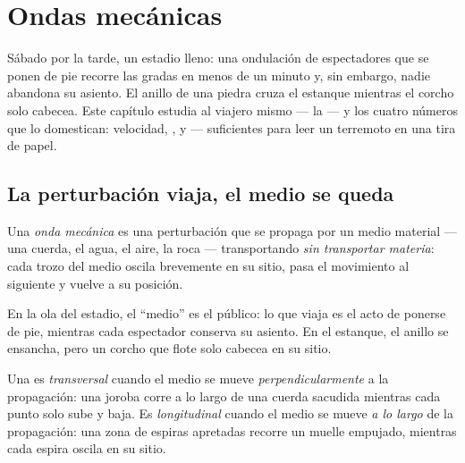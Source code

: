 \chapter{Ondas mecánicas}\label{ch:g12:mechanical-waves}

Sábado por la tarde, un estadio lleno: una ondulación de espectadores
que se ponen de pie recorre las gradas en menos de un minuto y, sin
embargo, nadie abandona su asiento. El anillo de una piedra cruza el
estanque mientras el corcho solo cabecea. Este capítulo estudia al
viajero mismo --- la  --- y los cuatro números que lo domestican:
velocidad, ,  y  --- suficientes para leer
un terremoto en una tira de papel.

\section{La perturbación viaja, el medio se queda}

\begin{definition}\label{def:g12:mechanical-waves:wave}
Una \emph{onda mecánica} es una perturbación que se
propaga por un medio material --- una cuerda, el agua, el aire, la roca
--- transportando  \emph{sin transportar materia}: cada trozo del
medio oscila brevemente en su sitio, pasa el movimiento al siguiente y
vuelve a su posición.
\end{definition}

\begin{example}\label{ex:g12:mechanical-waves:transport}
En la ola del estadio, el ``medio'' es el público: lo que viaja es el
acto de ponerse de pie, mientras cada espectador conserva su asiento. En
el estanque, el anillo se ensancha, pero un corcho que flote solo
cabecea en su sitio.
\end{example}

\begin{definition}\label{def:g12:mechanical-waves:transverse}
Una  es \emph{transversal} cuando el medio
se mueve \emph{perpendicularmente} a la propagación: una joroba corre a
lo largo de una cuerda sacudida mientras cada punto solo sube y baja. Es
\emph{longitudinal} cuando el medio se mueve
\emph{a lo largo} de la propagación: una zona de espiras apretadas
recorre un muelle empujado, mientras cada espira oscila en su sitio.
\end{definition}

